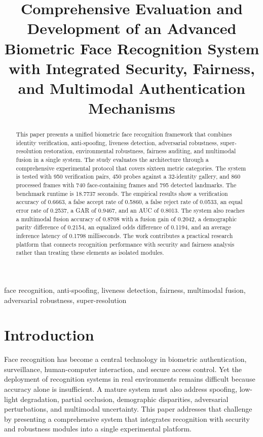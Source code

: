 \documentclass[conference]{IEEEtran}
\title{Comprehensive Evaluation and Development of an Advanced Biometric Face Recognition System with Integrated Security, Fairness, and Multimodal Authentication Mechanisms}
\author{
\IEEEauthorblockN{Project Research Compilation}
\IEEEauthorblockA{Independent Research and Development Study}
}
\begin{document}
\maketitle

\begin{abstract}
This paper presents a unified biometric face recognition framework that combines identity verification, anti-spoofing, liveness detection, adversarial robustness, super-resolution restoration, environmental robustness, fairness auditing, and multimodal fusion in a single system. The study evaluates the architecture through a comprehensive experimental protocol that covers sixteen metric categories. The system is tested with 950 verification pairs, 450 probes against a 32-identity gallery, and 860 processed frames with 740 face-containing frames and 795 detected landmarks. The benchmark runtime is 18.7737 seconds. The empirical results show a verification accuracy of 0.6663, a false accept rate of 0.5860, a false reject rate of 0.0533, an equal error rate of 0.2537, a GAR of 0.9467, and an AUC of 0.8013. The system also reaches a multimodal fusion accuracy of 0.8708 with a fusion gain of 0.2042, a demographic parity difference of 0.2154, an equalized odds difference of 0.1194, and an average inference latency of 0.1798 milliseconds. The work contributes a practical research platform that connects recognition performance with security and fairness analysis rather than treating these elements as isolated modules.
\end{abstract}

\begin{IEEEkeywords}
face recognition, anti-spoofing, liveness detection, fairness, multimodal fusion, adversarial robustness, super-resolution
\end{IEEEkeywords}

\tableofcontents

\section{Introduction}
Face recognition has become a central technology in biometric authentication, surveillance, human-computer interaction, and secure access control. Yet the deployment of recognition systems in real environments remains difficult because accuracy alone is insufficient. A mature system must also address spoofing, low-light degradation, partial occlusion, demographic disparities, adversarial perturbations, and multimodal uncertainty. This paper addresses that challenge by presenting a comprehensive system that integrates recognition with security and robustness modules into a single experimental platform.
\end{document}
